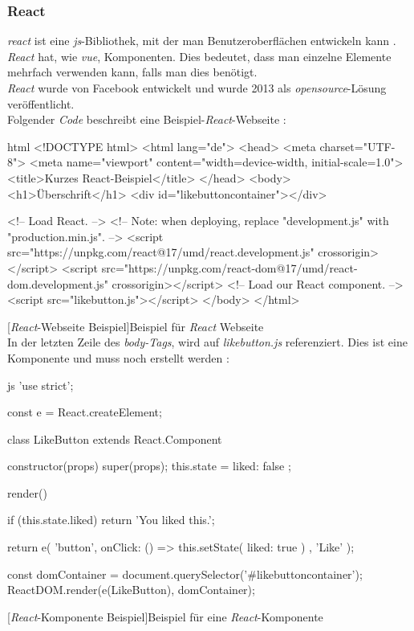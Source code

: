 \subsubsection{React}
\textit{\Gls{react}} ist eine \textit{\Gls{js}}-Bibliothek, mit der man Benutzeroberflächen entwickeln kann \cite{reactdoc}. \textit{React} hat, wie \textit{\Gls{vue}}, Komponenten. Dies bedeutet, dass man einzelne Elemente mehrfach verwenden kann, falls man dies benötigt.\\
\textit{React} wurde von Facebook entwickelt und wurde 2013 als \textit{\Gls{opensource}}-Lösung veröffentlicht.\\
Folgender \textit{Code} beschreibt eine Beispiel-\textit{React}-Webseite \cite{reactdoc}:
\begin{code}{html}
	<!DOCTYPE html>
	<html lang="de">
		<head>
			<meta charset="UTF-8">
			<meta name="viewport" content="width=device-width, initial-scale=1.0">
			<title>Kurzes React-Beispiel</title>
		</head>
		<body>
			<h1>Überschrift</h1>
			<div id="likebuttoncontainer"></div>
			
			<!-- Load React. -->
			<!-- Note: when deploying, replace "development.js" with "production.min.js". -->
			<script src="https://unpkg.com/react@17/umd/react.development.js" crossorigin></script>
			<script src="https://unpkg.com/react-dom@17/umd/react-dom.development.js" crossorigin></script>
			<!-- Load our React component. -->
			<script src="likebutton.js"></script>
		</body>
	</html>
\end{code}
[\textit{React}-Webseite Beispiel]{Beispiel für \textit{React} Webseite}~\\
\newpage
In der letzten Zeile des \textit{body-Tags}, wird auf \textit{likebutton.js} referenziert. Dies ist eine Komponente und muss noch erstellt werden \cite{reactdoc}:
\begin{code}{js}
	'use strict';
	
	const e = React.createElement;
	
	class LikeButton extends React.Component {
		constructor(props) {
			super(props);
			this.state = { liked: false };
		}
		
		render() {
			if (this.state.liked) {
				return 'You liked this.';
			}
			
			return e(
			'button',
			{ onClick: () => this.setState({ liked: true }) },
			'Like'
			);
		}
	}
	
	const domContainer = document.querySelector('#likebuttoncontainer');
	ReactDOM.render(e(LikeButton), domContainer);
\end{code}
[\textit{React}-Komponente Beispiel]{Beispiel für eine \textit{React}-Komponente}
\newpage
